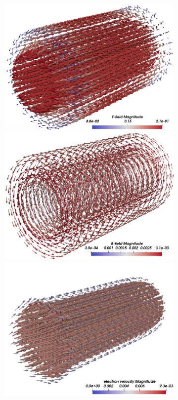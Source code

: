 \documentclass{article}
\begin{document}
\begin{figure}
\begin{subfigure}[b]{\textwidth}
\begin{tikzpicture}
        \end{tikzpicture}
        \includegraphics[scale=0.25]{E-field_lambda-0.png}
        \hspace{0.3cm}
        \includegraphics[scale=0.25]{B-field_lambda-0.png}
        \includegraphics[scale=0.25]{electronVel_lambda-0.png}

\end{subfigure}
\end{figure}
\end{document}
